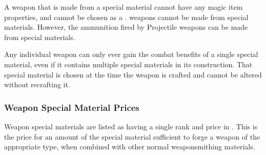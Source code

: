     A weapon that is made from a special material cannot have any magic item properties, and cannot be chosen as a .
     weapons cannot be made from special materials.
    However, the ammunition fired by Projectile weapons can be made from special materials.

    Any individual weapon can only ever gain the combat benefits of a single special material, even if it contains multiple special materials in its construction.
    That special material is chosen at the time the weapon is crafted and cannot be altered without recrafting it.

    \subsubsection{Weapon Special Material Prices}
      Weapon special materials are listed as having a single rank and price in .
      This is the price for an amount of the special material sufficient to forge a weapon of the appropriate type, when combined with other normal weaponsmithing materials.

